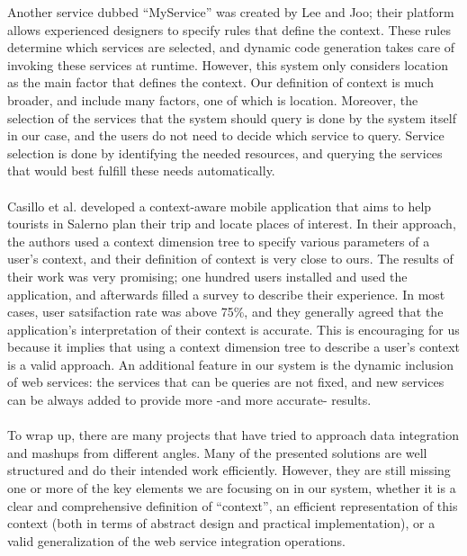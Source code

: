 Another service dubbed ``MyService'' was created by Lee and Joo\cite{myservice}; their platform allows experienced designers to specify rules that define the context. These rules determine which services are selected, and dynamic code generation takes care of invoking these services at runtime. However, this system only considers location as the main factor that defines the context. Our definition of context is much broader, and include many factors, one of which is location. Moreover, the selection of the services that the system should query is done by the system itself in our case, and the users do not need to decide which service to query. Service selection is done by identifying the needed resources, and querying the services that would best fulfill these needs automatically.\\\\
Casillo et al.\cite{casillo} developed a context-aware mobile application that aims to help tourists in Salerno plan their trip and locate places of interest. In their approach, the authors used a context dimension tree to specify various parameters of a user's context, and their definition of context is very close to ours. The results of their work was very promising; one hundred users installed and used the application, and afterwards filled a survey to describe their experience. In most cases, user satsifaction rate was above 75\%, and they generally agreed that the application's interpretation of their context is accurate. This is encouraging for us because it implies that using a context dimension tree to describe a user's context is a valid approach. An additional feature in our system is the dynamic inclusion of web services: the services that can be queries are not fixed, and new services can be always added to provide more -and more accurate- results.\\\\
To wrap up, there are many projects that have tried to approach data integration and mashups from different angles. Many of the presented solutions are well structured and do their intended work efficiently. However, they are still missing one or more of the key elements we are focusing on in our system, whether it is a clear and comprehensive definition of ``context'', an efficient representation of this context (both in terms of abstract design and practical implementation), or a valid generalization of the web service integration operations.